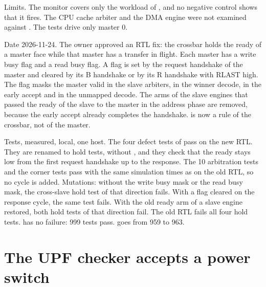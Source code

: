 \begin{record}

Limits. The monitor covers only the workload of , and no negative control shows that it fires. The CPU cache arbiter and the DMA engine were not examined against . The tests drive only master 0.

\end{record}

\begin{record}

Date 2026-11-24. The owner approved an RTL fix: the crossbar holds the ready of a master face while that master has a transfer in flight. Each master has a write busy flag and a read busy flag. A flag is set by the request handshake of the master and cleared by its B handshake or by its R handshake with RLAST high. The flag masks the master valid in the slave arbiters, in the winner decode, in the early accept and in the unmapped decode. The arms of the slave engines that passed the ready of the slave to the master in the address phase are removed, because the early accept already completes the handshake.  is now a rule of the crossbar, not of the master.

\end{record}

\begin{record}

Tests, measured, local, one host. The four defect tests of  pass on the new RTL. They are renamed to hold tests, without , and they check that the ready stays low from the first request handshake up to the response. The 10 arbitration tests and the corner tests pass with the same simulation times as on the old RTL, so no cycle is added. Mutations: without the write busy mask or the read busy mask, the cross-slave hold test of that direction fails. With a flag cleared on the response cycle, the same test fails. With the old ready arm of a slave engine restored, both hold tests of that direction fail. The old RTL fails all four hold tests.  has no failure: 999 tests pass.  goes from 959 to 963.

\end{record}

\section{The UPF checker accepts a power switch}\label{cr:defect:upf-checker-power-switch}

